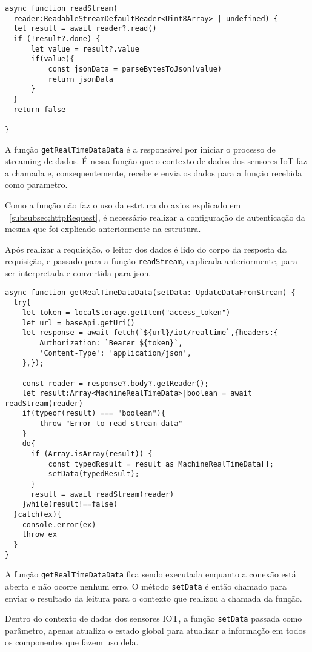\begin{verbatim}
async function readStream(
  reader:ReadableStreamDefaultReader<Uint8Array> | undefined) {
  let result = await reader?.read()
  if (!result?.done) {
      let value = result?.value
      if(value){
          const jsonData = parseBytesToJson(value)        
          return jsonData
      }
  }
  return false

}
\end{verbatim}

A função \texttt{getRealTimeDataData} é a responsável por iniciar o processo de streaming de dados. É nessa função que o contexto de dados dos sensores IoT faz a chamada e, consequentemente, recebe e envia os dados para a função recebida como parametro.

Como a função não faz o uso da estrtura do axios explicado em ~\ref{subsubsec:httpRequest}, é necessário realizar a configuração de autenticação da mesma que foi explicado anteriormente na estrutura.

Após realizar a requisição, o leitor dos dados é lido do corpo da resposta da requisição, e passado para a função \texttt{readStream}, explicada anteriormente, para ser interpretada e convertida para \gls{json}.

\begin{verbatim}
async function getRealTimeDataData(setData: UpdateDataFromStream) {
  try{
    let token = localStorage.getItem("access_token")
    let url = baseApi.getUri()
    let response = await fetch(`${url}/iot/realtime`,{headers:{
        Authorization: `Bearer ${token}`,
        'Content-Type': 'application/json',
    },});

    const reader = response?.body?.getReader();
    let result:Array<MachineRealTimeData>|boolean = await readStream(reader)
    if(typeof(result) === "boolean"){
        throw "Error to read stream data"
    }
    do{
      if (Array.isArray(result)) {
          const typedResult = result as MachineRealTimeData[];
          setData(typedResult);
      }
      result = await readStream(reader)
    }while(result!==false)
  }catch(ex){
    console.error(ex)
    throw ex
  }
}
\end{verbatim}

A função \texttt{getRealTimeDataData} fica sendo executada enquanto a conexão está aberta e não ocorre nenhum erro. O método \texttt{setData} é então chamado para enviar o resultado da leitura para o contexto que realizou a chamada da função.

Dentro do contexto de dados dos sensores IOT, a função \texttt{setData} passada como parâmetro, apenas atualiza o estado global para atualizar a informação em todos os componentes que fazem uso dela.

